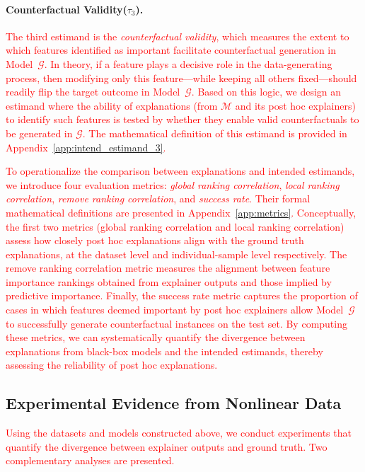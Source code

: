 \documentclass[mnsc,blindrev]{informs3}
\begin{document}
\paragraph{Counterfactual Validity($\tau_3$).} 
\textcolor{red}{The third estimand is the \textit{counterfactual validity}, which measures the extent to which features identified as important facilitate counterfactual generation in Model~$\mathcal{G}$. In theory, if a feature plays a decisive role in the data-generating process, then modifying only this feature—while keeping all others fixed—should readily flip the target outcome in Model~$\mathcal{G}$. Based on this logic, we design an estimand where the ability of explanations (from $\mathcal{M}$ and its post hoc explainers) to identify such features is tested by whether they enable valid counterfactuals to be generated in $\mathcal{G}$. The mathematical definition of this estimand is provided in Appendix~\ref{app:intend_estimand_3}.}

\textcolor{red}{To operationalize the comparison between explanations and intended estimands, we introduce four evaluation metrics: \textit{global ranking correlation}, \textit{local ranking correlation}, \textit{remove ranking correlation}, and \textit{success rate}. Their formal mathematical definitions are presented in Appendix~\ref{app:metrics}. Conceptually, the first two metrics (global ranking correlation and local ranking correlation) assess how closely post hoc explanations align with the ground truth explanations, at the dataset level and individual-sample level respectively. The remove ranking correlation metric measures the alignment between feature importance rankings obtained from explainer outputs and those implied by predictive importance. Finally, the success rate metric captures the proportion of cases in which features deemed important by post hoc explainers allow Model~$\mathcal{G}$ to successfully generate counterfactual instances on the test set. By computing these metrics, we can systematically quantify the divergence between explanations from black-box models and the intended estimands, thereby assessing the reliability of post hoc explanations.}

\subsection{Experimental Evidence from Nonlinear Data}
\label{sec:nonlinear_results}

\textcolor{red}{Using the datasets and models constructed above, we conduct experiments that quantify the divergence between explainer outputs and ground truth. Two complementary analyses are presented.}
\end{document}
